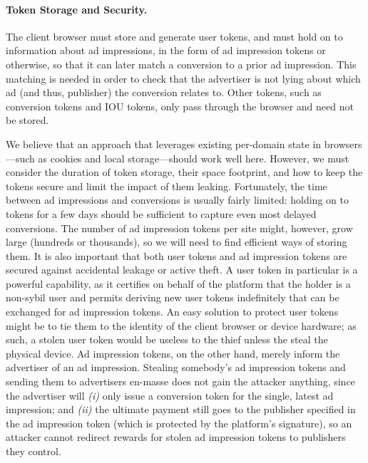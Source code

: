 \paragraph{Token Storage and Security.}
%
The client browser must store and generate user tokens, and must hold on to information about ad impressions, in the form of ad impression tokens or otherwise, so that it can later match a conversion to a prior ad impression.
%
This matching is needed in order to check that the advertiser is not lying about which ad (and thus, publisher) the conversion relates to.
%
Other tokens, such as conversion tokens and IOU tokens, only pass through the browser and need not be stored.
%

%
We believe that an approach that leverages existing per-domain state in browsers---such as cookies and local storage---should work well here.
%
However, we must consider the duration of token storage, their space footprint, and how to keep the tokens secure and limit the impact of them leaking.
%
Fortunately, the time between ad impressions and conversions is usually fairly limited: holding on to tokens for a few days should be sufficient to capture even most delayed conversions.
%
The number of ad impression tokens per site might, however, grow large (hundreds or thousands), so we will need to find efficient ways of storing them.
%
It is also important that both user tokens and ad impression tokens are secured against accidental leakage or active theft.
%
A user token in particular is a powerful capability, as it certifies on behalf of the platform that the holder is a non-sybil user and permits deriving new user tokens indefinitely that can be exchanged for ad impression tokens.
%
An easy solution to protect user tokens might be to tie them to the identity of the client browser or device hardware; as such, a stolen user token would be useless to the thief unless the steal the physical device.
%
Ad impression tokens, on the other hand, merely inform the advertiser of an ad impression.
%
Stealing somebody's ad impression tokens and sending them to advertisers en-masse does not gain the attacker anything, since the advertiser will \emph{(i)} only issue a conversion token for the single, latest ad impression; and \emph{(ii)} the ultimate payment still goes to the publisher specified in the ad impression token (which is protected by the platform's signature), so an attacker cannot redirect rewards for stolen ad impression tokens to publishers they control.
%

